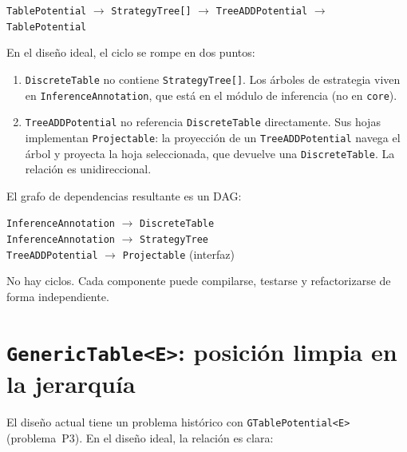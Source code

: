 \documentclass[11pt,a4paper]{article}
\newcommand{\code}[1]{\texttt{#1}}
\begin{document}
\begin{center}
\code{TablePotential} $\longrightarrow$ \code{StrategyTree[]}
$\longrightarrow$ \code{TreeADDPotential}
$\longrightarrow$ \code{TablePotential}
\end{center}

En el diseño ideal, el ciclo se rompe en dos puntos:

\begin{enumerate}
  \item \code{DiscreteTable} no contiene \code{StrategyTree[]}.  Los
        árboles de estrategia viven en \code{InferenceAnnotation}, que
        está en el módulo de inferencia (no en \code{core}).

  \item \code{TreeADDPotential} no referencia \code{DiscreteTable}
        directamente.  Sus hojas implementan \code{Projectable}:
        la proyección de un \code{TreeADDPotential} navega el árbol y
        proyecta la hoja seleccionada, que devuelve una \code{DiscreteTable}.
        La relación es unidireccional.
\end{enumerate}

El grafo de dependencias resultante es un DAG:

\begin{center}
\code{InferenceAnnotation} $\to$ \code{DiscreteTable} \\
\code{InferenceAnnotation} $\to$ \code{StrategyTree} \\
\code{TreeADDPotential} $\to$ \code{Projectable} (interfaz)
\end{center}

No hay ciclos.  Cada componente puede compilarse, testarse y refactorizarse
de forma independiente.

\section{\code{GenericTable<E>}: posición limpia en la jerarquía}
\label{sec:ideal-gtable}

El diseño actual tiene un problema histórico con \code{GTablePotential<E>}
(problema~P3).  En el diseño ideal, la relación es clara:
\end{document}
